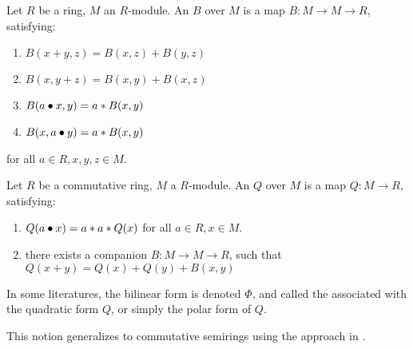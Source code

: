 \begin{definition}
    \label{BilinForm}
    \leanok

    Let $R$ be a ring, $M$ an $R$-module. An  $B$ over $M$ is a map $B : M \to M \to R$, satisfying:

    \begin{enumerate}

    \item $ B(x + y, z) = B(x, z) +B(y, z) $
    
    \item $ B(x, y + z) = B(x, y) +B(x, z) $
    
    \item $ B(a \bullet x, y) = a * B(x, y)$
    
    \item $ B(x, a \bullet y) = a * B(x, y)$
        
    \end{enumerate}

    for all $a \in R, x, y, z \in M$.

\end{definition}

\begin{definition}
    \label{QuadraticForm}
    \leanok

    Let $R$ be a commutative ring, $M$ a $R$-module. An  $Q$ over $M$ is a map $Q : M \to R$, satisfying:

    \begin{enumerate}

    \item $ Q(a \bullet x) = a * a * Q(x)$ for all $a \in R, x \in M$.
    
    \item there exists a companion  $B : M \to M \to R$, such that $Q(x + y) = Q(x) + Q(y) + B(x, y)$
    
    \end{enumerate}

    In some literatures, the bilinear form is denoted $\Phi$, and called the  associated with the quadratic form $Q$,
    or simply the polar form of $Q$.

\end{definition}

\begin{remark}
    \label{mk:QuadraticForm}

    This notion generalizes to commutative semirings using the approach in \cite{izhakian2016supertropical}.
    
\end{remark}